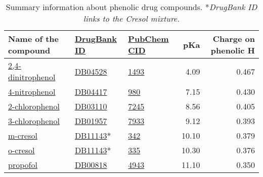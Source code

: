\documentclass[oneside]{memoir}
\begin{document}
\begin{table}
\renewcommand\thetable{1}
\begin{tabular}{lllrr}
\toprule
\textbf{Name of the compound} & \textbf{\href{https://www.drugbank.ca/}{DrugBank ID}} & \textbf{\href{https://pubchem.ncbi.nlm.nih.gov/}{PubChem CID}} & \textbf{pKa} & \textbf{Charge on phenolic H}\\
\midrule
\href{https://en.wikipedia.org/wiki/2,4-Dinitrophenol}{2,4-dinitrophenol} &
\href{https://www.drugbank.ca/drugs/DB04528}{DB04528} &
\href{https://pubchem.ncbi.nlm.nih.gov/compound/1493}{1493} &
4.09 &
0.467 \\
\href{https://en.wikipedia.org/wiki/4-Nitrophenol}{4-nitrophenol} &
\href{https://www.drugbank.ca/drugs/DB04417}{DB04417} &
\href{https://pubchem.ncbi.nlm.nih.gov/compound/980}{980} &
7.15 &
0.430 \\
\href{https://en.wikipedia.org/wiki/2-Chlorophenol}{2-chlorophenol} &
\href{https://www.drugbank.ca/drugs/DB03110}{DB03110} &
\href{https://pubchem.ncbi.nlm.nih.gov/compound/7245}{7245} &
8.56 &
0.405 \\
\href{https://en.wikipedia.org/wiki/3-Chlorophenol}{3-chlorophenol} &
\href{https://www.drugbank.ca/drugs/DB01957}{DB01957} &
\href{https://pubchem.ncbi.nlm.nih.gov/compound/7933}{7933} &
9.12 &
0.393 \\
\href{https://en.wikipedia.org/wiki/M-Cresol}{m-cresol} &
\href{https://www.drugbank.ca/drugs/DB11143}{DB11143}* &
\href{https://pubchem.ncbi.nlm.nih.gov/compound/342}{342} &
10.10 &
0.379 \\
\href{https://en.wikipedia.org/wiki/O-Cresol}{o-cresol} &
\href{https://www.drugbank.ca/drugs/DB11143}{DB11143}*&
\href{https://pubchem.ncbi.nlm.nih.gov/compound/335}{335} &
10.30 &
0.376 \\
\href{https://en.wikipedia.org/wiki/Propofol}{propofol} &
\href{https://www.drugbank.ca/drugs/DB00818}{DB00818} &
\href{https://pubchem.ncbi.nlm.nih.gov/compound/4943}{4943} &
11.10 &
0.350 \\
\bottomrule
\end{tabular}

\caption{Summary information about phenolic drug compounds. *\textit{DrugBank ID links to the Cresol mixture.}}


\end{table}
\end{document}
